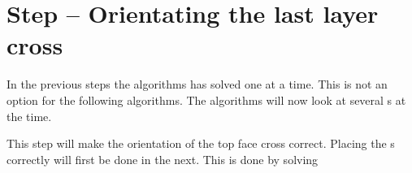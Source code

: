 \section{Step -- Orientating the last layer cross}
In the previous steps the algorithms has solved one \cpiece{} at a time. This is not an option for the following algorithms. The algorithms will now look at several \cpiece{}s at the time. 

This step will make the orientation of the top face cross correct. Placing the \cpiece{}s correctly will first be done in the next. This is done by solving
